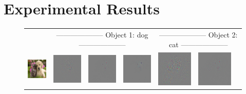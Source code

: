 \section{Experimental Results}
\label{sec:experiment}

\setlength{\tabcolsep}{0.5pt}
\begin{figure}
\begin{center}
\begin{tabular}{ccccccc}
& \multicolumn{3}{c}{\small -------------------- Object 1: dog --------------------} & \multicolumn{3}{c}{\small -------------------- Object 2: cat --------------------} \\
\vspace{-2.5pt}
\includegraphics[width=0.14\linewidth,height=0.115\linewidth]{figs/examples/googlenet/oxford/dog-cat1} &
\includegraphics[width=0.14\linewidth,height=0.115\linewidth]{figs/examples/googlenet/oxford/dog-cat1_diff_258} &
\includegraphics[width=0.14\linewidth,height=0.115\linewidth]{figs/examples/googlenet/deconv/dog-cat1_diff_258} &
\includegraphics[width=0.14\linewidth,height=0.115\linewidth]{figs/examples/googlenet/soft/dog-cat1_diff_258} &
\includegraphics[width=0.14\linewidth,height=0.115\linewidth]{figs/examples/googlenet/oxford/dog-cat1_diff_286} &
\includegraphics[width=0.14\linewidth,height=0.115\linewidth]{figs/examples/googlenet/deconv/dog-cat1_diff_286} &

\end{tabular}
\end{center}
\end{figure}
